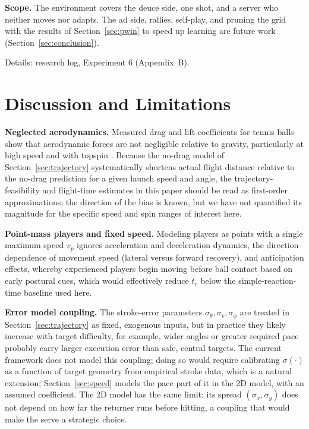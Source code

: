   \textbf{Scope.} The environment covers the deuce side, one shot, and a server
  who neither moves nor adapts. The ad side, rallies, self-play, and pruning
  the grid with the results of Section~\ref{sec:pwin} to speed up learning are
  future work (Section~\ref{sec:conclusion}).

  Details: research log, Experiment 6 (Appendix~B).

  \section{Discussion and Limitations}\label{sec:discussion}

  \textbf{Neglected aerodynamics.} Measured drag and lift coefficients for
  tennis balls show that aerodynamic forces are not negligible relative to
  gravity, particularly at high speed and with topspin \cite{cross2014drag}.
  Because the no-drag model of Section~\ref{sec:trajectory} systematically
  shortens actual flight distance relative to the no-drag prediction for a
  given launch speed and angle, the trajectory-feasibility and flight-time
  estimates in this paper should be read as first-order approximations; the
  direction of the bias is known, but we have not quantified its magnitude for
  the specific speed and spin ranges of interest here.

  \textbf{Point-mass players and fixed speed.} Modeling players as points with a
  single maximum speed $v_p$ ignores acceleration and deceleration dynamics,
  the direction-dependence of movement speed (lateral versus forward recovery),
  and anticipation effects, whereby experienced players begin moving before
  ball contact based on early postural cues, which would effectively reduce
  $t_r$ below the simple-reaction-time baseline used here.

  \textbf{Error model coupling.} The stroke-error parameters $\sigma_\theta,
  \sigma_v, \sigma_\phi$ are treated in Section~\ref{sec:trajectory} as fixed,
  exogenous inputs, but in practice they likely increase with target
  difficulty, for example, wider angles or greater required pace probably carry
  larger execution error than safe, central targets. The current framework does
  not model this coupling; doing so would require calibrating $\sigma(\cdot)$
  as a function of target geometry from empirical stroke data, which is a
  natural extension; Section~\ref{sec:speed} models the pace part of it in the
  2D model, with an assumed coefficient. The 2D model has the same limit: its
  spread $(\sigma_x, \sigma_y)$ does not depend on how far the returner runs
  before hitting, a coupling that would make the serve a strategic choice.

